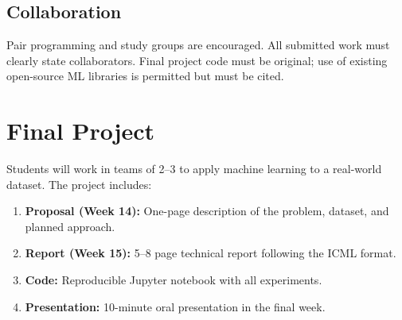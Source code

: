\documentclass[
    language=english,
    doctype=curriculum,
    institution=none,
]{../../omnilatex}
\begin{document}
\subsection{Collaboration}
Pair programming and study groups are encouraged. All submitted work must clearly state collaborators. Final project code must be original; use of existing open-source ML libraries is permitted but must be cited.

\section{Final Project}

Students will work in teams of 2--3 to apply machine learning to a real-world dataset. The project includes:

\begin{enumerate}
    \item \textbf{Proposal (Week 14):} One-page description of the problem, dataset, and planned approach.
    \item \textbf{Report (Week 15):} 5--8 page technical report following the ICML format.
    \item \textbf{Code:} Reproducible Jupyter notebook with all experiments.
    \item \textbf{Presentation:} 10-minute oral presentation in the final week.
\end{enumerate}
\end{document}
